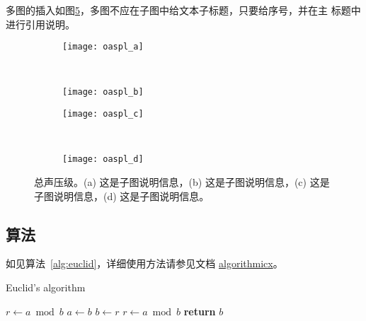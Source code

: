 多图的插入如图\ref{fig:oaspl}，多图不应在子图中给文本子标题，只要给序号，并在主
标题中进行引用说明。
\begin{figure}[!htbp]
    \centering
    \begin{subfigure}[b]{0.35\textwidth}
      \texttt{[image: oaspl\_a]}
      \caption{}
      \label{fig:oaspl_a}
    \end{subfigure}%
    ~%
    \begin{subfigure}[b]{0.35\textwidth}
      \texttt{[image: oaspl\_b]}
      \caption{}
      \label{fig:oaspl_b}
    \end{subfigure}
    \begin{subfigure}[b]{0.35\textwidth}
      \texttt{[image: oaspl\_c]}
      \caption{}
      \label{fig:oaspl_c}
    \end{subfigure}%
    ~%
    \begin{subfigure}[b]{0.35\textwidth}
      \texttt{[image: oaspl\_d]}
      \caption{}
      \label{fig:oaspl_d}
    \end{subfigure}
    \caption{总声压级。(a) 这是子图说明信息，(b) 这是子图说明信息，(c) 这是子图说明信息，(d) 这是子图说明信息。}
    \label{fig:oaspl}
\end{figure}

\subsection{算法}

如见算法~\ref{alg:euclid}，详细使用方法请参见文档
\href{https://ctan.org/pkg/algorithmicx?lang=en}{algorithmicx}。

\begin{algorithm}[!htbp]
    \small
    \caption{Euclid's algorithm}\label{alg:euclid}
    \begin{algorithmic}[1]
        \State $r\gets a\bmod b$
        \State $a\gets b$
        \State $b\gets r$
        \State $r\gets a\bmod b$
        \EndWhile\label{euclidendwhile}
        \State \textbf{return} $b$
        \EndProcedure
    \end{algorithmic}
\end{algorithm}

